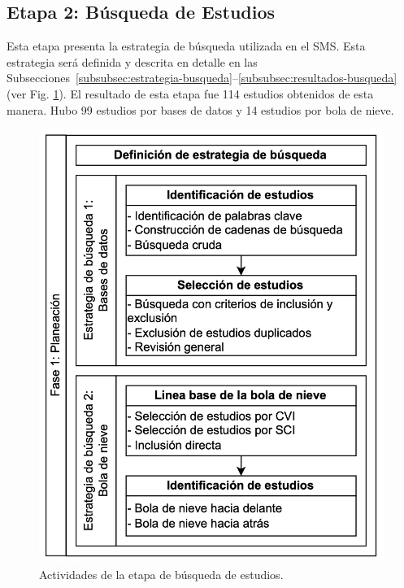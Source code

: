 \newcommand{\totalStudies}{114}
\newcommand{\databaseStudies}{99}
\newcommand{\snowballStudies}{14}
\newcommand{\directInclusionStudies}{0}



\subsection{Etapa 2: Búsqueda de Estudios}

Esta etapa presenta la estrategia de búsqueda utilizada en el SMS\@. Esta estrategia será definida y descrita en detalle en las Subsecciones~\ref{subsubsec:estrategia-busqueda}--\ref{subsubsec:resultados-busqueda} (ver Fig. \ref{fig:busqueda-estudios}).
El resultado de esta etapa fue \totalStudies{} estudios obtenidos de esta manera. Hubo \databaseStudies{} estudios por bases de datos y  \snowballStudies{} estudios por bola de nieve.


\begin{figure}[htbp]
	\centering
	\vspace{10pt}
	\includegraphics[scale=0.3]{resources/figures/fig03-fase1-planeacion.png}
	\vspace{6pt}
	\caption{Actividades de la etapa de búsqueda de estudios.}
	\label{fig:busqueda-estudios}
\end{figure}



